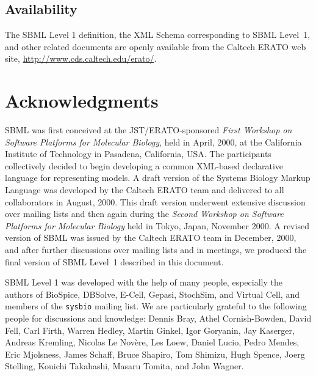 \documentclass[10pt]{cekarticle}
\begin{document}
\subsection{Availability}
\label{sec:availability}

The SBML Level 1 definition, the XML Schema corresponding to SBML Level~1,
and other related documents are openly available from the Caltech ERATO web
site, \url{http://www.cds.caltech.edu/erato/}.



\setcounter{secnumdepth}{-1}
\section{Acknowledgments}
\label{sec:acknowledgements}

SBML was first conceived at the JST/ERATO-sponsored \emph{First Workshop on
  Software Platforms for Molecular Biology}, held in April, 2000, at the
California Institute of Technology in Pasadena, California, USA.  The
participants collectively decided to begin developing a common XML-based
declarative language for representing models.  A draft version of the
Systems Biology Markup Language was developed by the Caltech ERATO team and
delivered to all collaborators in August, 2000.  This draft version
underwent extensive discussion over mailing lists and then again during the
\emph{Second Workshop on Software Platforms for Molecular Biology} held in
Tokyo, Japan, November 2000.  A revised version of SBML was issued by the
Caltech ERATO team in December, 2000, and after further discussions over
mailing lists and in meetings, we produced the final version of SBML
Level~1 described in this document.

SBML Level 1 was developed with the help of many people, especially the
authors of BioSpice, DBSolve, E-Cell, Gepasi, StochSim, and Virtual Cell,
and members of the \texttt{sysbio} mailing list.  We are particularly
grateful to the following people for discussions and knowledge: Dennis
Bray, Athel Cornish-Bowden, David Fell, Carl Firth, Warren Hedley, Martin
Ginkel, Igor Goryanin, Jay Kaserger, Andreas Kremling, Nicolas Le
Nov\`{e}re, Les Loew, Daniel Lucio, Pedro Mendes, Eric Mjolsness, James
Schaff, Bruce Shapiro, Tom Shimizu, Hugh Spence, Joerg Stelling, Kouichi
Takahashi, Masaru Tomita, and John Wagner.
\end{document}
